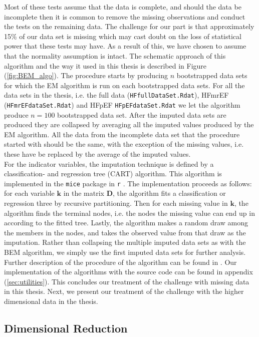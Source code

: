 \documentclass[../thesis.tex]{subfiles}
\begin{document}
Most of these tests assume that the data is complete, and should the data be incomplete then it is common to remove the missing observations and conduct the tests on the remaining data. The challenge for our part is that approximately 15\% of our data set is missing which may cast doubt on the loss of statistical power that these tests may have. As a result of this, we have chosen to assume that the normality assumption is intact. The schematic approach of this algorithm and the way it used in this thesis is described in Figure (\ref{fig:BEM_algo}). The procedure starts by producing $n$ bootstrapped data sets for which the EM algorithm is run on each bootstrapped data sets.  For all the data sets in the thesis, i.e. the full data (\texttt{HFfullDataSet.Rdat}), HFmrEF (\texttt{HFmrEFdataSet.Rdat}) and HFpEF \texttt{HFpEFdataSet.Rdat} we let the algorithm produce $n = 100$ bootstrapped data set. After the imputed data sets are produced they are collapsed by averaging all the imputed values produced by the EM algorithm. All the data from the incomplete data set that the procedure started with should be the same, with the exception of the missing values, i.e. these have be replaced by the average of the imputed values.\\
\indent For the indicator variables, the imputation technique is defined by a classification- and regression tree (CART) algorithm. This algorithm is implemented in the \texttt{mice} package in \texttt{r} \citep{buuren2010mice}. The implementation proceeds as follows: for each variable $\boldsymbol{k}$ in the matrix $\boldsymbol{D}$, the algorithm fits a classification or regression three by recursive partitioning. Then for each missing value in $\boldsymbol{k}$, the algorithm finds the terminal nodes, i.e. the nodes the missing value can end up in according to the fitted tree. Lastly, the algorithm makes a random draw among the members in the nodes, and takes the observed value from that draw as the imputation. Rather than collapsing the multiple imputed data sets as with the BEM algorithm, we simply use the first imputed data sets for further analysis. Further description of the procedure of the algorithm can be found in \cite{burgette2010multiple}. Our implementation of the algorithms with the source code can be found in appendix (\ref{sec:utilities}). This concludes our treatment of the challenge with missing data in this thesis. Next, we present our treatment of the challenge with the higher dimensional data in the thesis.

\subsection{Dimensional Reduction}
\label{subsec:dim_red}
\end{document}
